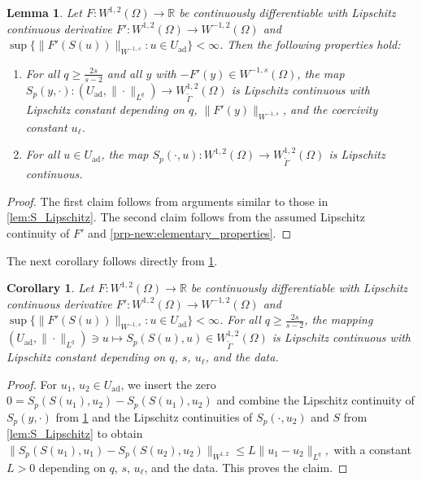 \documentclass[11pt]{article}
\newcommand{\R}{\mathbb{R}}
\newcommand{\feas}{U_{\textrm{ad}}}
\newtheorem{lemma}[theorem]{Lemma}
\newtheorem{corollary}[theorem]{Corollary}
\theoremstyle{definition}
\theoremstyle{remark}
\begin{document}
\begin{lemma}\label{lem:SpLipschitz}
Let $F: W^{1,2}(\Omega)\to \R$ be continuously differentiable
with  Lipschitz continuous derivative $F' : W^{1,2}(\Omega) \to W^{-1,2}(\Omega)$
and $\sup\{ \|F'(S(u))\|_{W^{-1,s}} : u \in \feas\} < \infty$.
Then the following properties hold:
\begin{enumerate}
\item For all $q \ge \frac{2s}{s-2}$ and all $y$ with $-F'(y) \in W^{-1,s}(\Omega)$, the map $ 
S_p(y,\cdot): (\feas, \|\cdot\|_{L^q}) \to W^{1,2}_{\tilde\Gamma}(\Omega)$ 
is Lipschitz continuous with Lipschitz constant depending on $q$,
$\|F'(y)\|_{W^{-1,s}}$, and the coercivity constant $u_\ell$.

\item For all $u \in \feas$, the map $
S_p(\cdot,u) : W^{1,2}(\Omega) \to W^{1,2}_{\tilde\Gamma}(\Omega)$
is Lipschitz continuous.
\end{enumerate}
\end{lemma}
\begin{proof}
The first claim follows from arguments similar to those in \cref{lem:S_Lipschitz}.
The second claim follows from the assumed Lipschitz continuity of $F'$
and \cref{prp-new:elementary_properties}.
\end{proof}
%
The next corollary follows directly from \cref{lem:SpLipschitz}.
%
\begin{corollary}\label{cor:Sp_JointlyLipschitz}
Let $F: W^{1,2}(\Omega)\to \R$ be continuously differentiable
with  Lipschitz continuous derivative $F' : W^{1,2}(\Omega) \to W^{-1,2}(\Omega)$
and $\sup\{ \|F'(S(u))\|_{W^{-1,s}} : u \in \feas\} < \infty$.
For all $q \ge \frac{2s}{s-2}$, the mapping $(\feas,\|\cdot\|_{L^q}) \ni u \mapsto S_p(S(u), u) \in W^{1,2}_{\tilde\Gamma}(\Omega)$ 
is Lipschitz continuous with Lipschitz constant depending on $q$, $s$, $u_\ell$, and the data.  
\end{corollary}
\begin{proof}
For $u_1$, $u_2\in\feas$, we insert the zero
$0 = S_p(S(u_1),u_2) - S_p(S(u_1),u_2)$
and combine the Lipschitz continuity of $S_p(y,\cdot)$ from \cref{lem:SpLipschitz}
and the Lipschitz continuities of $S_p(\cdot,u_2)$ and $S$ from \cref{lem:S_Lipschitz}
to obtain
$
\|S_p(S(u_1),u_1)-S_p(S(u_2),u_2)\|_{W^{1,2}}
\le
L\|u_1-u_2\|_{L^q},
$
with a constant $L>0$ depending on $q$, $s$, $u_\ell$, and the data.  
This proves the claim.
\end{proof}
\end{document}
